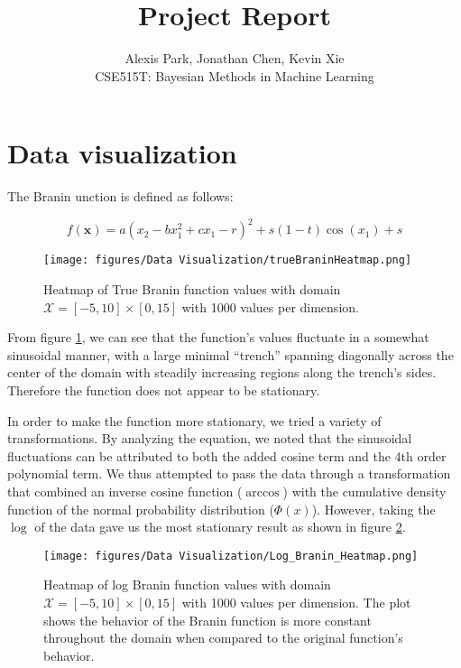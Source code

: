 \documentclass[11pt]{article}
\newcommand{\Course}{CSE515T: Bayesian Methods in Machine Learning}
\newcommand{\mc}[1]{\mathcal{#1}}
\numberwithin{equation}{section}
\begin{document}
\title{Project Report}
\author{Alexis Park, Jonathan Chen, Kevin Xie \\ \Course}

\maketitle

\section{Data visualization}

The Branin unction is defined as follows:

\begin{equation}
  f(\bm{x}) = a(x_2 - bx_1^2 + cx_1 - r)^2 + s(1 - t)\cos(x_1) + s
  \label{eq:Branin}
\end{equation}

\begin{figure}[H]
  \centering
  \texttt{[image: figures/Data Visualization/trueBraninHeatmap.png]}
  \caption{Heatmap of True Branin function values with domain $\mc{X} = [-5, 10] \times [0, 15]$  with 1000 values per dimension.}
  \label{fig:true_Branin_heatmap}
\end{figure}

From figure \ref{fig:true_Branin_heatmap}, we can see that the function's
values fluctuate in a somewhat sinusoidal manner, with a large minimal
``trench'' spanning diagonally across the center of the domain with steadily
increasing regions along the trench's sides. Therefore the function does not
appear to be stationary.

In order to make the function more stationary, we tried a variety of
transformations. By analyzing the equation, we noted that the sinusoidal
fluctuations can be attributed to both the added cosine term and the 4th
order polynomial term. We thus attempted to pass the data through a
transformation that combined an inverse cosine function ($\arccos$) with the
cumulative density function of the normal probability distribution
($\Phi(x)$). However, taking the $\log$ of the data gave us the most
stationary result as shown in figure \ref{fig:log_Branin_heatmap}.

\begin{figure}[H]
  \centering
  \texttt{[image: figures/Data Visualization/Log\_Branin\_Heatmap.png]}
  \caption{Heatmap of log Branin function values with domain $\mc{X} = [-5,
  10] \times [0, 15]$ with 1000 values per dimension. The plot shows the
  behavior of the Branin function is more constant throughout the domain when
  compared to the original function's behavior.}
  \label{fig:log_Branin_heatmap}
\end{figure}
\end{document}
